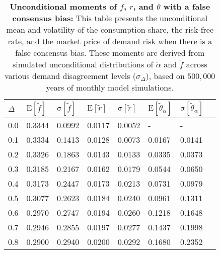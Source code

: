 \begin{table}[h!]
\centering
\caption{\textbf{Unconditional moments of $f$, $r$, and $\theta$ with a false consensus bias:} This table presents the unconditional mean and volatility of the consumption share, the risk-free rate, and the market price of demand risk when there is a false consensus bias. These moments are derived from simulated unconditional distributions of $\tilde{\alpha}$ and $\tilde{f}$ across various demand disagreement levels ($\sigma_{\Delta}$), based on $500,000$ years of monthly model simulations.}
\begin{tabular}{|l|l|l|l|l|l|l|l|}
\hline
$\Delta$ & $\mathrm{E}[\tilde{f}]$ & $\mathrm{\sigma}[\tilde{f}]$ & $\mathrm{E}[\tilde{r}]$ & $\mathrm{\sigma}[\tilde{r}]$ 
& $\mathrm{E}[\tilde{\theta}_{\alpha}]$ & $\mathrm{\sigma}[\tilde{\theta}_{\alpha}]$ \\
\hline
0.0   & 0.3344 & 0.0992 & 0.0117 & 0.0052 & -    & -      \\
0.1   & 0.3334 & 0.1413 & 0.0128 & 0.0073 & 0.0167 & 0.0141 \\
0.2   & 0.3326 & 0.1863 & 0.0143 & 0.0133 & 0.0335 & 0.0373 \\
0.3   & 0.3185 & 0.2167 & 0.0162 & 0.0179 & 0.0544 & 0.0650 \\
0.4   & 0.3173 & 0.2447 & 0.0173 & 0.0213 & 0.0731 & 0.0979 \\
0.5   & 0.3077 & 0.2623 & 0.0184 & 0.0240 & 0.0961 & 0.1311 \\
0.6   & 0.2970 & 0.2747 & 0.0194 & 0.0260 & 0.1218 & 0.1648 \\
0.7   & 0.2946 & 0.2855 & 0.0197 & 0.0277 & 0.1437 & 0.1998 \\
0.8   & 0.2900 & 0.2940 & 0.0200 & 0.0292 & 0.1680 & 0.2352 \\
\hline
\end{tabular}
\end{table}
